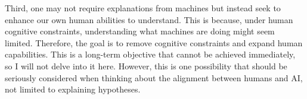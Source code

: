\documentclass{book}
\begin{document}
Third, one may not require explanations from machines but instead seek to enhance our own human abilities to understand. This is because, under human cognitive constraints, understanding what machines are doing might seem limited. Therefore, the goal is to remove cognitive constraints and expand human capabilities. This is a long-term objective that cannot be achieved immediately, so I will not delve into it here. However, this is one possibility that should be seriously considered when thinking about the alignment between humans and AI, not limited to explaining hypotheses.



\end{document}
